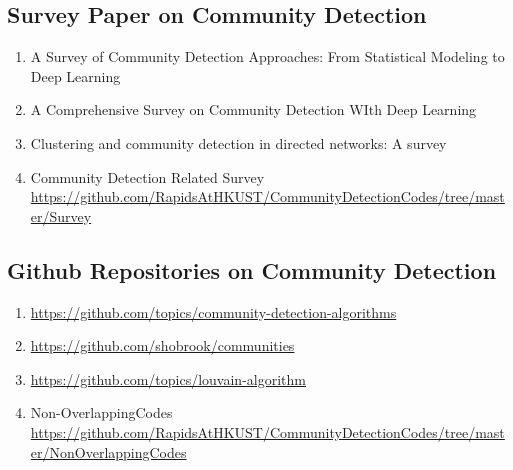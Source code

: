 \documentclass{article}
\begin{document}
\subsection{Survey Paper on Community Detection}
\begin{enumerate}
    \item A Survey of Community Detection Approaches: From Statistical Modeling to Deep Learning \cite{jin2021survey}
    \item A Comprehensive Survey on Community Detection WIth Deep Learning \cite{su2022comprehensive}
    \item Clustering and community detection in directed networks: A survey \cite{malliaros2013clustering}
    \item Community Detection Related Survey \url{https://github.com/RapidsAtHKUST/CommunityDetectionCodes/tree/master/Survey}
 \end{enumerate}  

\subsection{Github Repositories on Community Detection}
\begin{enumerate}
    \item \url{https://github.com/topics/community-detection-algorithms}
    \item \url{https://github.com/shobrook/communities}
    \item \url{https://github.com/topics/louvain-algorithm}
    \item Non-OverlappingCodes \url{https://github.com/RapidsAtHKUST/CommunityDetectionCodes/tree/master/NonOverlappingCodes}
 \end{enumerate}  



% 


\end{document}
